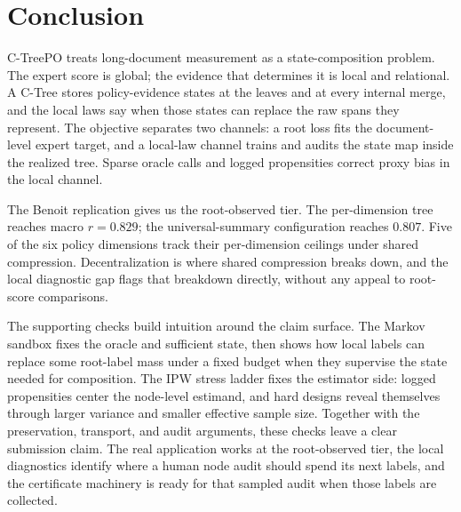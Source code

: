 \section{Conclusion}\label{sec:v8-conclusion}

C-TreePO treats long-document measurement as a state-composition
problem. The expert score is global; the evidence that determines it
is local and relational. A C-Tree stores policy-evidence states at
the leaves and at every internal merge, and the local laws say when
those states can replace the raw spans they represent. The objective
separates two channels: a root loss fits the document-level expert
target, and a local-law channel trains and audits the state map
inside the realized tree. Sparse oracle calls and logged
propensities correct proxy bias in the local channel.

The Benoit replication gives us the root-observed tier. The
per-dimension tree reaches macro \(r=0.829\); the universal-summary
configuration reaches \(0.807\). Five of the six policy dimensions
track their per-dimension ceilings under shared compression.
Decentralization is where shared compression breaks down, and the
local diagnostic gap flags that breakdown directly, without any
appeal to root-score comparisons.

The supporting checks build intuition around the claim surface. The
Markov sandbox fixes the oracle and sufficient state, then shows how
local labels can replace some root-label mass under a fixed budget
when they supervise the state needed for composition. The IPW stress
ladder fixes the estimator side: logged propensities center the
node-level estimand, and hard designs reveal themselves through larger
variance and smaller effective sample size. Together with the
preservation, transport, and audit arguments, these checks leave a
clear submission claim. The real application works at the root-observed tier, the
local diagnostics identify where a human node audit should spend its
next labels, and the certificate machinery is ready for that sampled
audit when those labels are collected.

